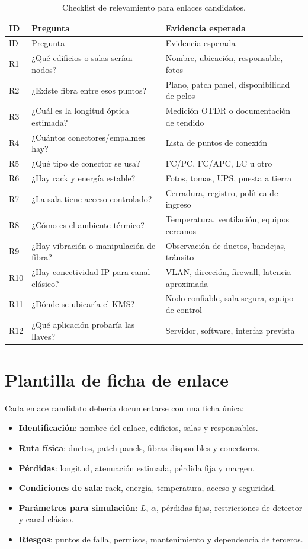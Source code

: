 \begin{longtable}{p{}p{}p{}}
  \caption{Checklist de relevamiento para enlaces candidatos.}
  \label{tab:checklist_campus}\\
  \toprule
  ID & Pregunta & Evidencia esperada \\
  \midrule
  \endfirsthead
  \toprule
  ID & Pregunta & Evidencia esperada \\
  \midrule
  \endhead
  R1 & ¿Qué edificios o salas serían nodos? & Nombre, ubicación, responsable, fotos \\
  R2 & ¿Existe fibra entre esos puntos? & Plano, patch panel, disponibilidad de pelos \\
  R3 & ¿Cuál es la longitud óptica estimada? & Medición OTDR o documentación de tendido \\
  R4 & ¿Cuántos conectores/empalmes hay? & Lista de puntos de conexión \\
  R5 & ¿Qué tipo de conector se usa? & FC/PC, FC/APC, LC u otro \\
  R6 & ¿Hay rack y energía estable? & Fotos, tomas, UPS, puesta a tierra \\
  R7 & ¿La sala tiene acceso controlado? & Cerradura, registro, política de ingreso \\
  R8 & ¿Cómo es el ambiente térmico? & Temperatura, ventilación, equipos cercanos \\
  R9 & ¿Hay vibración o manipulación de fibra? & Observación de ductos, bandejas, tránsito \\
  R10 & ¿Hay conectividad IP para canal clásico? & VLAN, dirección, firewall, latencia aproximada \\
  R11 & ¿Dónde se ubicaría el KMS? & Nodo confiable, sala segura, equipo de control \\
  R12 & ¿Qué aplicación probaría las llaves? & Servidor, software, interfaz prevista \\
  \bottomrule
\end{longtable}

\section{Plantilla de ficha de enlace}

Cada enlace candidato debería documentarse con una ficha única:

\begin{itemize}
  \item \textbf{Identificación}: nombre del enlace, edificios, salas y responsables.
  \item \textbf{Ruta física}: ductos, patch panels, fibras disponibles y conectores.
  \item \textbf{Pérdidas}: longitud, atenuación estimada, pérdida fija y margen.
  \item \textbf{Condiciones de sala}: rack, energía, temperatura, acceso y seguridad.
  \item \textbf{Parámetros para simulación}: \(L\), \(\alpha\), pérdidas fijas, restricciones de detector y canal clásico.
  \item \textbf{Riesgos}: puntos de falla, permisos, mantenimiento y dependencia de terceros.
\end{itemize}

